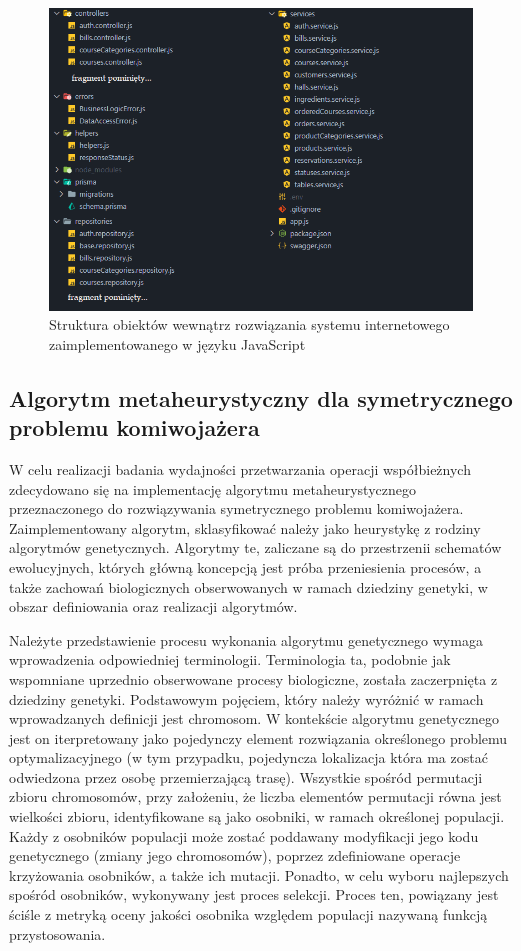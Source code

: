 \begin{figure}[ht]
    \centering
     \includegraphics[width=\linewidth]{rys04/struktura-plikow-nodejs.png}
    \caption{Struktura obiektów wewnątrz rozwiązania systemu internetowego zaimplementowanego w języku JavaScript}
    \label{fig:struktura-plikow-nodejs}
\end{figure}

\subsection*{Algorytm metaheurystyczny dla symetrycznego problemu komiwojażera}
\label{label:algorytm-genetyczny}
W celu realizacji badania wydajności przetwarzania operacji współbieżnych zdecydowano się na implementację algorytmu metaheurystycznego przeznaczonego do rozwiązywania symetrycznego problemu komiwojażera. Zaimplementowany algorytm, sklasyfikować należy jako heurystykę z rodziny algorytmów genetycznych. Algorytmy te, zaliczane są do przestrzenii schematów ewolucyjnych, których główną koncepcją jest próba przeniesienia procesów, a także zachowań biologicznych obserwowanych w ramach dziedziny genetyki, w obszar definiowania oraz realizacji algorytmów. 

Należyte przedstawienie procesu wykonania algorytmu genetycznego wymaga wprowadzenia odpowiedniej terminologii. Terminologia ta, podobnie jak wspomniane uprzednio obserwowane procesy biologiczne, została zaczerpnięta z dziedziny genetyki. Podstawowym pojęciem, który należy wyróżnić w ramach wprowadzanych definicji jest chromosom. W kontekście algorytmu genetycznego jest on iterpretowany jako pojedynczy element rozwiązania określonego problemu optymalizacyjnego (w tym przypadku, pojedyncza lokalizacja która ma zostać odwiedzona przez osobę przemierzającą trasę). Wszystkie spośród permutacji zbioru chromosomów, przy założeniu, że liczba elementów permutacji równa jest wielkości zbioru, identyfikowane są jako osobniki, w ramach określonej populacji. Każdy z osobników populacji może zostać poddawany modyfikacji jego kodu genetycznego (zmiany jego chromosomów), poprzez zdefiniowane operacje krzyżowania osobników, a także ich mutacji. Ponadto, w celu wyboru najlepszych spośród osobników, wykonywany jest proces selekcji. Proces ten, powiązany jest ściśle z metryką oceny jakości osobnika względem populacji nazywaną funkcją przystosowania.

